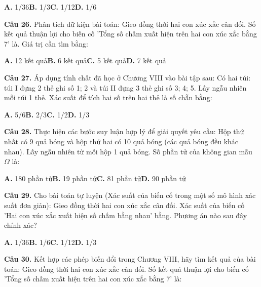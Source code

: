 \documentclass[11pt,a4paper]{article}
\begin{document}
\hspace*{1.5em}\textbf{A.} 1/36\quad\quad \textbf{B.} 1/3\quad\quad \textbf{C.} 1/12\quad\quad \textbf{D.} 1/6\par\vspace{2pt}
\textbf{\color{primary} Câu 26.} Phân tích dữ kiện bài toán: Gieo đồng thời hai con xúc xắc cân đối. Số kết quả thuận lợi cho biến cố 'Tổng số chấm xuất hiện trên hai con xúc xắc bằng 7' là. Giá trị cần tìm bằng:\par
\hspace*{1.5em}\textbf{A.} 12 kết quả\quad\quad \textbf{B.} 6 kết quả\quad\quad \textbf{C.} 5 kết quả\quad\quad \textbf{D.} 7 kết quả\par\vspace{2pt}
\textbf{\color{primary} Câu 27.} Áp dụng tính chất đã học ở Chương VIII vào bài tập sau: Có hai túi: túi I đựng 2 thẻ ghi số 1; 2 và túi II đựng 3 thẻ ghi số 3; 4; 5. Lấy ngẫu nhiên mỗi túi 1 thẻ. Xác suất để tích hai số trên hai thẻ là số chẵn bằng:\par
\hspace*{1.5em}\textbf{A.} 5/6\quad\quad \textbf{B.} 2/3\quad\quad \textbf{C.} 1/2\quad\quad \textbf{D.} 1/3\par\vspace{2pt}
\textbf{\color{primary} Câu 28.} Thực hiện các bước suy luận hợp lý để giải quyết yêu cầu: Hộp thứ nhất có 9 quả bóng và hộp thứ hai có 10 quả bóng (các quả bóng đều khác nhau). Lấy ngẫu nhiên từ mỗi hộp 1 quả bóng. Số phần tử của không gian mẫu $\Omega$ là:\par
\hspace*{1.5em}\textbf{A.} 180 phần tử\quad\quad \textbf{B.} 19 phần tử\quad\quad \textbf{C.} 81 phần tử\quad\quad \textbf{D.} 90 phần tử\par\vspace{2pt}
\textbf{\color{primary} Câu 29.} Cho bài toán tự luyện (Xác suất của biến cố trong một số mô hình xác suất đơn giản): Gieo đồng thời hai con xúc xắc cân đối. Xác suất của biến cố 'Hai con xúc xắc xuất hiện số chấm bằng nhau' bằng. Phương án nào sau đây chính xác?\par
\hspace*{1.5em}\textbf{A.} 1/36\quad\quad \textbf{B.} 1/6\quad\quad \textbf{C.} 1/12\quad\quad \textbf{D.} 1/3\par\vspace{2pt}
\textbf{\color{primary} Câu 30.} Kết hợp các phép biến đổi trong Chương VIII, hãy tìm kết quả của bài toán: Gieo đồng thời hai con xúc xắc cân đối. Số kết quả thuận lợi cho biến cố 'Tổng số chấm xuất hiện trên hai con xúc xắc bằng 7' là:\par
\end{document}

